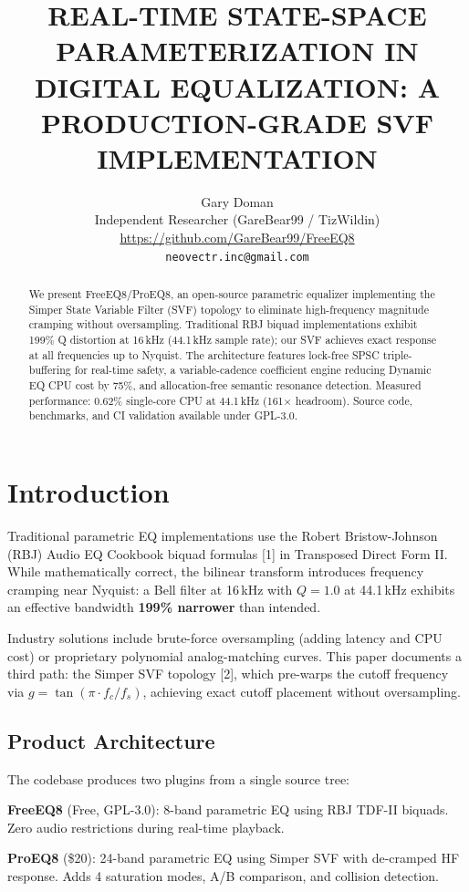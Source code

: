 \documentclass[10pt,twocolumn,a4paper]{article}
\title{\textbf{REAL-TIME STATE-SPACE PARAMETERIZATION IN DIGITAL EQUALIZATION: A PRODUCTION-GRADE SVF IMPLEMENTATION}}
\author{Gary Doman\\
Independent Researcher (GareBear99 / TizWildin)\\
\url{https://github.com/GareBear99/FreeEQ8}\\
\texttt{neovectr.inc@gmail.com}}
\date{}
\begin{document}
\maketitle

\begin{abstract}
We present FreeEQ8/ProEQ8, an open-source parametric equalizer implementing the Simper State Variable Filter (SVF) topology to eliminate high-frequency magnitude cramping without oversampling. Traditional RBJ biquad implementations exhibit 199\% Q distortion at 16\,kHz (44.1\,kHz sample rate); our SVF achieves exact response at all frequencies up to Nyquist. The architecture features lock-free SPSC triple-buffering for real-time safety, a variable-cadence coefficient engine reducing Dynamic EQ CPU cost by 75\%, and allocation-free semantic resonance detection. Measured performance: 0.62\% single-core CPU at 44.1\,kHz (161$\times$ headroom). Source code, benchmarks, and CI validation available under GPL-3.0.
\end{abstract}

\section{Introduction}
Traditional parametric EQ implementations use the Robert Bristow-Johnson (RBJ) Audio EQ Cookbook biquad formulas [1] in Transposed Direct Form II. While mathematically correct, the bilinear transform introduces frequency cramping near Nyquist: a Bell filter at 16\,kHz with $Q=1.0$ at 44.1\,kHz exhibits an effective bandwidth \textbf{199\% narrower} than intended.

Industry solutions include brute-force oversampling (adding latency and CPU cost) or proprietary polynomial analog-matching curves. This paper documents a third path: the Simper SVF topology [2], which pre-warps the cutoff frequency via $g = \tan(\pi \cdot f_c / f_s)$, achieving exact cutoff placement without oversampling.

\subsection{Product Architecture}
The codebase produces two plugins from a single source tree:

\textbf{FreeEQ8} (Free, GPL-3.0): 8-band parametric EQ using RBJ TDF-II biquads. Zero audio restrictions during real-time playback.

\textbf{ProEQ8} (\$20): 24-band parametric EQ using Simper SVF with de-cramped HF response. Adds 4 saturation modes, A/B comparison, and collision detection.
\end{document}
